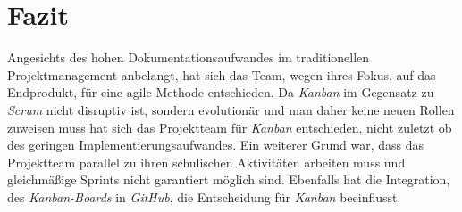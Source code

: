 \section{Fazit}
Angesichts des hohen Dokumentationsaufwandes im traditionellen Projektmanagement anbelangt, hat sich das Team, wegen ihres Fokus, auf das Endprodukt, für eine agile Methode entschieden. Da \textit{Kanban} im Gegensatz zu \textit{Scrum} nicht disruptiv ist, sondern evolutionär und man daher keine neuen Rollen zuweisen muss hat sich das Projektteam für \textit{Kanban} entschieden, nicht zuletzt ob des geringen Implementierungsaufwandes. Ein weiterer Grund war, dass das Projektteam parallel zu ihren schulischen Aktivitäten arbeiten muss und gleichmäßige Sprints nicht garantiert möglich sind. Ebenfalls hat die Integration, des \textit{Kanban-Boards} in \textit{GitHub}, die Entscheidung für \textit{Kanban} beeinflusst.